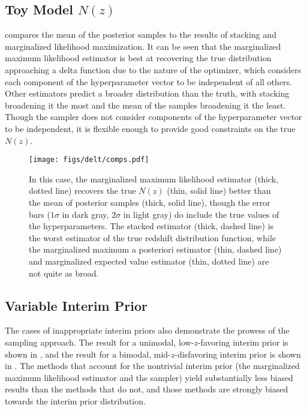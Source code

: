 \subsection{Toy Model $N(z)$}

 compares the mean of the posterior samples to the results of stacking and marginalized likelihood maximization.  
It can be seen that the marginalized maximum likelihood estimator is best at recovering the true distribution approaching a delta function due to the nature of the optimizer, which considers each component of the hyperparameter vector to be independent of all others.  
Other estimators predict a broader distribution than the truth, with stacking broadening it the most and the mean of the samples broadening it the least.  
Though the sampler does not consider components of the hyperparameter vector to be independent, it is flexible enough to provide good constraints on the true $N(z)$.

\begin{figure}
	\texttt{[image: figs/delt/comps.pdf]}
	\caption{In this case, the marginalized maximum likelihood estimator (thick, dotted line) recovers the true $N(z)$ (thin, solid line) better than the mean of posterior samples (thick, solid line), though the error bars ($1\sigma$ in dark gray, $2\sigma$ in light gray) do include the true values of the hyperparameters. 
		The stacked estimator (thick, dashed line) is the worst estimator of the true redshift distribution function, while the marginalized maximum a posteriori estimator (thin, dashed line) and marginalized expected value estimator (thin, dotted line) are not quite as broad.}
\end{figure}

\subsection{Variable Interim Prior}

The cases of inappropriate interim priors also demonstrate the prowess of the sampling approach.  
The result for a unimodal, low-$z$-favoring interim prior is shown in , and the result for a bimodal, mid-$z$-disfavoring interim prior is shown in .  
The methods that account for the nontrivial interim prior (the marginalized maximum likelihood estimator and the sampler) yield substantially less biased results than the methods that do not, and those methods are strongly biased towards the interim prior distribution.  

